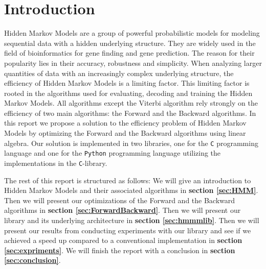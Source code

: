 \section{Introduction}
Hidden Markov Models\cite{baum1966} are a group of powerful probabilistic models for modeling sequential data with a hidden underlying structure. They are widely used in the field of bioinformatics for gene finding and gene prediction. The reason for their popularity lies in their accuracy, robustness and simplicity.
When analyzing larger quantities of data with an increasingly complex underlying structure, the efficiency of Hidden Markov Models is a limiting factor. This limiting factor is rooted in the algorithms used for evaluating, decoding and training the Hidden Markov Models. All algorithms except the Viterbi algorithm rely strongly on the efficiency of two main algorithms: the Forward and the Backward algorithms.
In this report we propose a solution to the efficiency problem of Hidden Markov Models by optimizing the Forward and the Backward algorithms using linear algebra. Our solution is implemented in two libraries, one for the \texttt{C} programming language and one for the \texttt{Python} programming language utilizing the implementations in the \texttt{C}-library.

{\small The rest of this report is structured as follows: We will give an introduction to Hidden Markov Models and their associated algorithms in \textbf{section \ref{sec:HMM}}. Then we will present our optimizations of the Forward and the Backward algorithms in \textbf{section \ref{sec:ForwardBackward}}. Then we will present our library and its underlying architecture in \textbf{section \ref{sec:hmmmlib}}. Then we will present our results from conducting experiments with our library and see if we achieved a speed up compared to a conventional implementation in \textbf{section \ref{sec:expriments}}. We will finish the report with a conclusion in \textbf{section \ref{sec:conclusion}}.}

